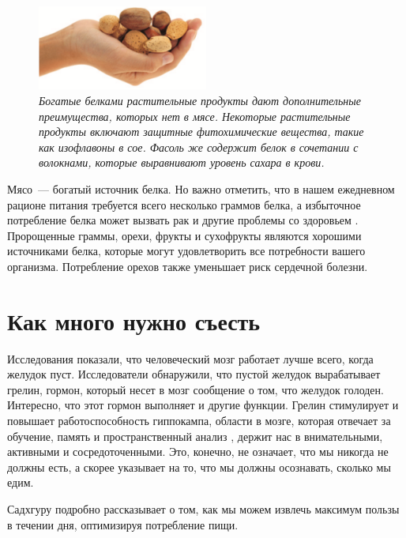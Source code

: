 \begin{DidYouKnow}
\begin{figure}
\includegraphics[width=0.5\textwidth]{img/hand.png}
    \caption{\textit{Богатые белками растительные продукты дают дополнительные преимущества, которых нет в мясе. Некоторые растительные продукты включают защитные фитохимические вещества, такие как изофлавоны в сое. Фасоль же содержит белок в сочетании с волокнами, которые выравнивают уровень сахара в крови.}}
\end{figure}

Мясо~--- богатый источник белка. Но важно отметить, что в нашем ежедневном рационе питания требуется всего несколько граммов белка, а избыточное потребление белка может вызвать рак \cite{ProteinCancer} и другие проблемы со здоровьем \cite{ProteinKidney}. Пророщенные граммы, орехи, фрукты и сухофрукты являются хорошими источниками белка, которые могут удовлетворить все потребности вашего организма. Потребление орехов также уменьшает риск сердечной болезни. \cite{NutsForTheHeart}
\end{DidYouKnow}

\section{Как много нужно съесть}
Исследования показали, что человеческий мозг работает лучше всего, когда желудок пуст. Исследователи обнаружили, что пустой желудок вырабатывает грелин, гормон, который несет в мозг сообщение о том, что желудок голоден. Интересно, что этот гормон выполняет и другие функции. Грелин стимулирует и повышает работоспособность гиппокампа, области в мозге, которая отвечает за обучение, память и пространственный анализ \cite{EmptyStomachIntelligence}, держит нас в внимательными, активными и сосредоточенными.  Это, конечно, не означает, что мы никогда не должны есть, а скорее указывает на то, что мы должны осознавать, сколько мы едим.

Садхгуру подробно рассказывает о том, как мы можем извлечь максимум пользы в течении дня, оптимизируя потребление пищи.

